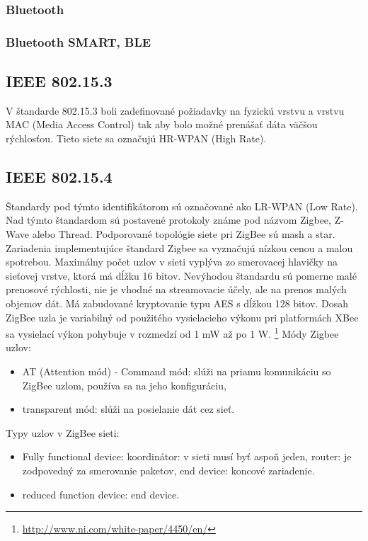 \documentclass[12pt,a4wide,oneside,openright]{report}
\begin{document}
\subsubsection{Bluetooth}

\subsubsection{Bluetooth SMART, BLE}

\subsection{IEEE 802.15.3}
V štandarde 802.15.3 boli zadefinované požiadavky na fyzickú vrstvu a vrstvu MAC (Media Access Control) tak aby bolo možné prenášať dáta väčšou rýchlosťou. Tieto siete sa označujú HR-WPAN (High Rate).

\subsection{IEEE 802.15.4}
Štandardy pod týmto identifikátorom sú označované ako LR-WPAN (Low Rate). Nad týmto štandardom sú postavené protokoly známe pod názvom Zigbee, Z-Wave alebo Thread.
Podporované topológie siete pri ZigBee sú mash a star. Zariadenia implementujúce štandard Zigbee sa vyznačujú nízkou cenou a malou spotrebou. Maximálny počet uzlov v sieti vyplýva zo smerovacej hlavičky na sieťovej vrstve, ktorá má dĺžku 16 bitov. Nevýhodou štandardu sú pomerne malé prenosové rýchlosti, nie je vhodné na streamovacie účely, ale na prenos malých objemov dát. Má zabudované kryptovanie typu AES s dĺžkou 128 bitov. Dosah ZigBee uzla je variabilný od použitého vysielacieho výkonu pri platformách XBee sa vysielací výkon pohybuje v rozmedzí od 1 mW až po 1 W.
\footnote{\url{http://www.ni.com/white-paper/4450/en/}}
Módy Zigbee uzlov:
\begin{itemize}
	\item AT (Attention mód) - Command mód: slúži na priamu komunikáciu so ZigBee uzlom, používa sa na jeho konfiguráciu,
	\item transparent mód: slúži na posielanie dát cez sieť.
\end{itemize}
\onehalfspacing

Typy uzlov v ZigBee sieti:
\singlespacing
\begin{itemize}
	\item Fully functional device:
		\subitem koordinátor: v sieti musí byť aspoň jeden,
		\subitem router: je zodpovedný za smerovanie paketov,
		\subitem end device: koncové zariadenie.
	\item reduced function device:
		\subitem end device.
\end{itemize}
\onehalfspacing
\end{document}
